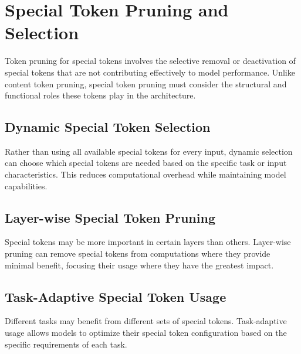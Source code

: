 \section{Special Token Pruning and Selection}

Token pruning for special tokens involves the selective removal or deactivation of special tokens that are not contributing effectively to model performance. Unlike content token pruning, special token pruning must consider the structural and functional roles these tokens play in the architecture.

\subsection{Dynamic Special Token Selection}

Rather than using all available special tokens for every input, dynamic selection can choose which special tokens are needed based on the specific task or input characteristics. This reduces computational overhead while maintaining model capabilities.

\subsection{Layer-wise Special Token Pruning}

Special tokens may be more important in certain layers than others. Layer-wise pruning can remove special tokens from computations where they provide minimal benefit, focusing their usage where they have the greatest impact.

\subsection{Task-Adaptive Special Token Usage}

Different tasks may benefit from different sets of special tokens. Task-adaptive usage allows models to optimize their special token configuration based on the specific requirements of each task.